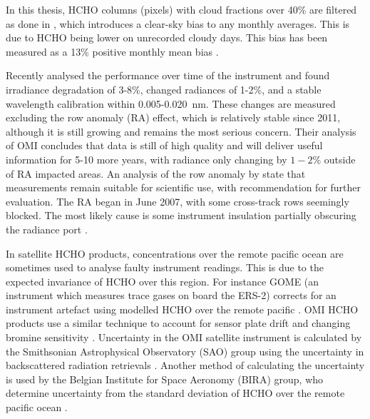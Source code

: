     
    In this thesis, HCHO columns (pixels) with cloud fractions over 40\% are filtered as done in \textcite{Palmer2001}, which introduces a clear-sky bias to any monthly averages.
    This is due to HCHO being lower on unrecorded cloudy days.
    This bias has been measured as a 13\% positive monthly mean bias \parencite{Palmer2001, Surl2018}.
    
    
    Recently \textcite{Schenkeveld2017} analysed the performance over time of the instrument and found irradiance degradation of 3-8\%, changed radiances of 1-2\%, and a stable wavelength calibration within 0.005-0.020~nm.
    These changes are measured excluding the row anomaly (RA) effect, which is relatively stable since 2011, although it is still growing and remains the most serious concern.
    Their analysis of OMI concludes that data is still of high quality and will deliver useful information for 5-10 more years, with radiance only changing by $1-2\%$ outside of RA impacted areas.
    An analysis of the row anomaly by \textcite{Huang2017} state that measurements remain suitable for scientific use, with recommendation for further evaluation.
    The RA began in June 2007, with some cross-track rows seemingly blocked. 
    The most likely cause is some instrument insulation partially obscuring the radiance port \parencite{Schenkeveld2017}.
    
    In satellite HCHO products, concentrations over the remote pacific ocean are sometimes used to analyse faulty instrument readings.
    This is due to the expected invariance of HCHO over this region.
    For instance GOME (an instrument which measures trace gases on board the ERS-2) corrects for an instrument artefact using modelled HCHO over the remote pacific \parencite{Shim2005}.
    OMI HCHO products use a similar technique to account for sensor plate drift and changing bromine sensitivity \parencite{Abad2015}.
    Uncertainty in the OMI satellite instrument is calculated by the Smithsonian Astrophysical Observatory (SAO) group using the uncertainty in backscattered radiation retrievals \parencite{Abad2015, Abad2016}.
    Another method of calculating the uncertainty is used by the Belgian Institute for Space Aeronomy (BIRA) group, who determine uncertainty from the standard deviation of HCHO over the remote pacific ocean \parencite{DeSmedt2012, DeSmedt2015}.
    
